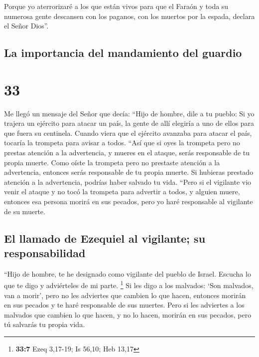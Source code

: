  Porque yo aterrorizaré a los que están vivos para que el
Faraón y toda su numerosa gente descansen con los paganos, con los
muertos por la espada, declara el Señor Dios''.

\hypertarget{la-importancia-del-mandamiento-del-guardio}{%
\subsection{La importancia del mandamiento del
guardio}\label{la-importancia-del-mandamiento-del-guardio}}

\hypertarget{section-32}{%
\section{33}\label{section-32}}

 Me llegó un mensaje del Señor que decía: 
``Hijo de hombre, dile a tu pueblo: Si yo trajera un ejército para
atacar un país, la gente de allí elegiría a uno de ellos para que fuera
su centinela.  Cuando viera que el ejército avanzaba para
atacar el país, tocaría la trompeta para avisar a todos. 
``Así que si oyes la trompeta pero no prestas atención a la advertencia,
y mueres en el ataque, serás responsable de tu propia muerte.
 Como oíste la trompeta pero no prestaste atención a la
advertencia, entonces serás responsable de tu propia muerte. Si hubieras
prestado atención a la advertencia, podrías haber salvado tu vida.
 ``Pero si el vigilante vio venir el ataque y no tocó la
trompeta para advertir a todos, y alguien muere, entonces esa persona
morirá en sus pecados, pero yo haré responsable al vigilante de su
muerte.

\hypertarget{el-llamado-de-ezequiel-al-vigilante-su-responsabilidad}{%
\subsection{El llamado de Ezequiel al vigilante; su
responsabilidad}\label{el-llamado-de-ezequiel-al-vigilante-su-responsabilidad}}

 ``Hijo de hombre, te he designado como vigilante del
pueblo de Israel. Escucha lo que te digo y adviérteles de mi parte.
\footnote{\textbf{33:7} Ezeq 3,17-19; Is 56,10; Heb 13,17}
 Si les digo a los malvados: `Son malvados, van a morir',
pero no les adviertes que cambien lo que hacen, entonces morirán en sus
pecados y te haré responsable de sus muertes.  Pero si les
adviertes a los malvados que cambien lo que hacen, y no lo hacen,
morirán en sus pecados, pero tú salvarás tu propia vida.

